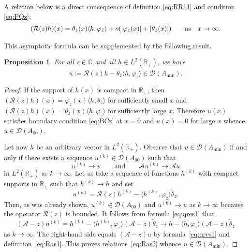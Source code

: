 \documentclass[pdftex]{sigma}%
\numberwithin{equation}{section}
\newtheorem{Proposition}[Theorem]{Proposition}
 { \theoremstyle{definition}
\newtheorem{Remark}[Theorem]{Remark} }
\begin{document}
A relation below is a direct consequence of definition \eqref{eq:RR11}
 and condition \eqref{eq:PQz}:
 \[
 ( {\mathcal R} (z)h) (x) = \theta_{z} (x) \langle h, \varphi_{\bar{z}} \rangle+ o(|\varphi_{z} (x)| +|\theta_{z} (x)| )\qquad {\rm as}\quad x\to\infty.
 \]

 This asymptotic formula can be supplemented by the following result.

 \begin{Proposition}\label{AS}
 For all $z\in {\mathbb C}$ and all $h\in L^2 ({\mathbb R}_{+})$, we have
 \begin{equation}
 u:= {\mathcal R} (z)h - \tilde{\theta}_{z} \langle h, \varphi_{ \bar{z}} \rangle\in {\mathcal D}(A_{\min}).
 \label{eq:Ras1}\end{equation}
 \end{Proposition}

\begin{proof}
If the support of $h(x)$ is compact in ${\mathbb R}_{+}$, then $ ( {\mathcal R} (z)h) (x) = \varphi_{z}(x) \langle h, \theta_{\bar{z}} \rangle$ for sufficiently small $x$ and $ ( {\mathcal R} (z)h) (x) = \theta_{z}(x) \langle h, \varphi_{\bar{z}} \rangle$ for sufficiently large $x$. Therefore $u(x)$ satisfies boundary condition \eqref{eq:BCz} at $x=0$ and $u(x)=0$ for large $x$ whence $u\in{\mathcal D}(A_{00})$.

Let now $h$ be an arbitrary vector in $L^2 ({\mathbb R}_{+})$. Observe that $ u \in {\mathcal D}(A_{\min})$ if and only if there exists a sequence $u^{(k)}\in {\mathcal D}(A_{00})$ such that
 \begin{equation}
u^{(k)}\to u \qquad \mbox{and} \qquad {\mathcal A}u^{(k)}\to {\mathcal A}u
 \label{eq:Ras2}\end{equation}
 in $L^2 ({\mathbb R}_{+})$ as $ k\to\infty$.
 Let us take a sequence of functions $h^{(k)} $ with compact supports in ${\mathbb R}_{+}$
 such that $h^{(k)}\to h$ and set
 \[
 u^{(k)}= {\mathcal R} (z)h^{(k)} - \big \langle h^{(k)}, \varphi_{\bar{z}} \big\rangle \tilde{\theta}_{z} .
 \]
 Then, as was already shown, $u^{(k)} \in {\mathcal D} (A_{00})$ and $u^{(k)}\to u$ as $k\to\infty$ because the operator $ {\mathcal R} (z)$ is bounded. It follows from formula \eqref{eq:qres1} that
 \[
({\mathcal A} -z) u^{(k)}= h^{(k)} - \big\langle h^{(k)}, \varphi_{\bar{z}} \big\rangle ({\mathcal A} -z) \tilde{\theta}_{z} \to h - \langle h, \varphi_{\bar{z}} \rangle ({\mathcal A} -z) \tilde{\theta}_{z}
\]
as $k\to\infty$. The right-hand side equals $({\mathcal A} -z) u$ by formula~\eqref{eq:qres1} and definition~\eqref{eq:Ras1}. This proves relations~\eqref{eq:Ras2} whence $u\in {\mathcal D}(A_{\min})$.
 \end{proof}
\end{document}

